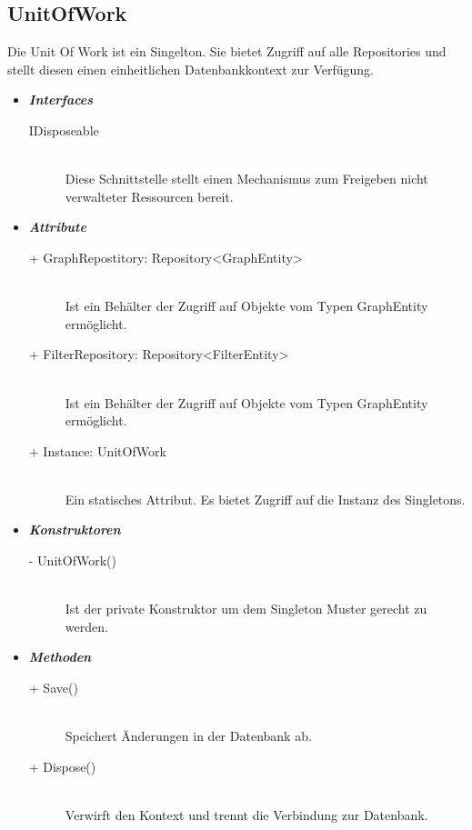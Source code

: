 \documentclass[13pt]{scrreprt}
\begin{document}
	\subsection{UnitOfWork}	
	Die Unit Of Work ist ein Singelton. Sie bietet Zugriff auf alle Repositories und stellt diesen einen einheitlichen Datenbankkontext zur Verf\"ugung.
	\begin{itemize}[label = {$\circ$}]
		\item {\large \textbf{\textit{Interfaces}}\par}
		\begin{description}
			\item [IDisposeable] \hfill \\ Diese Schnittstelle stellt einen Mechanismus zum Freigeben nicht verwalteter Ressourcen bereit.
		\end{description}
		\item {\large \textbf{\textit{Attribute}}\par}
		\begin{description}
			\item [+ GraphRepostitory: Repository<GraphEntity>] \hfill \\ Ist ein Beh\"alter der Zugriff auf Objekte vom Typen GraphEntity erm\"oglicht.		
			\item [+ FilterRepository: Repository<FilterEntity>] \hfill \\ Ist ein Beh\"alter der Zugriff auf Objekte vom Typen GraphEntity erm\"oglicht.
			\item [+ Instance: UnitOfWork] \hfill \\ Ein statisches Attribut. Es bietet Zugriff auf die Instanz des Singletons.
		\end{description}
		\item {\large \textbf{\textit{Konstruktoren}}\par}
		\begin{description}
			\item [-  UnitOfWork()] \hfill \\ Ist der private Konstruktor um dem Singleton Muster gerecht zu werden.
		\end{description}
		\item {\large \textbf{\textit{Methoden}}\par}
		\begin{description}
			\item [+ Save()] \hfill \\ Speichert \"Anderungen in der Datenbank ab.
			\item [+ Dispose()] \hfill \\ Verwirft den Kontext und trennt die Verbindung zur Datenbank.
		\end{description}
	\end{itemize}
	
\end{document}

